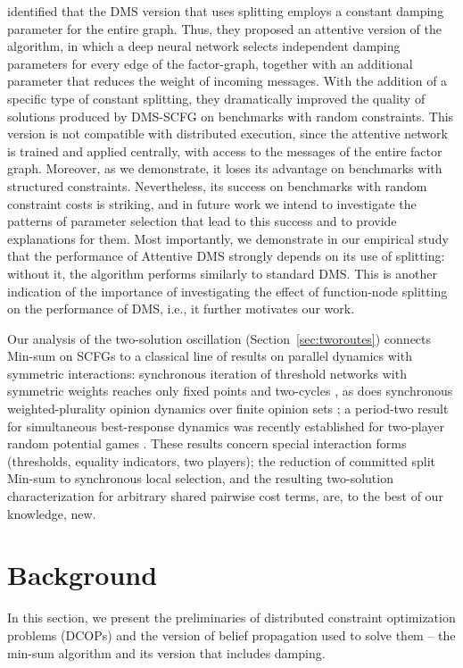 \documentclass[letterpaper]{article} %
\theoremstyle{definition}
\theoremstyle{remark}
\begin{document}
\citet{DengKL022} identified that the DMS version that uses splitting employs a constant damping parameter for the entire graph. Thus, they proposed an attentive version of the algorithm, in which a deep neural network selects independent damping parameters for every edge of the factor-graph, together with an additional parameter that reduces the weight of incoming messages. With the addition of a specific type of constant splitting, they dramatically improved the quality of solutions produced by DMS-SCFG on benchmarks with random constraints.
This version is not compatible with distributed execution, since the attentive network is trained and applied centrally, with access to the messages of the entire factor graph.%
Moreover, as we demonstrate, it loses its advantage on benchmarks with structured constraints. Nevertheless, its success on benchmarks with random constraint costs is striking, and in future work we intend to investigate the patterns of parameter selection that lead to this success and to provide explanations for them.
Most importantly, we demonstrate in our empirical study that the performance of Attentive DMS strongly depends on its use of splitting: without it, the algorithm performs similarly to standard DMS. This is another indication of the importance of investigating the effect of function-node splitting on the performance of DMS, i.e., it further motivates our work.

Our analysis of the two-solution oscillation (Section~\ref{sec:tworoutes}) connects Min-sum on SCFGs to a classical line of results on parallel dynamics with symmetric interactions: synchronous iteration of threshold networks with symmetric weights reaches only fixed points and two-cycles \citep{GolesOlivos80}, as does synchronous weighted-plurality opinion dynamics over finite opinion sets \citep{PoljakSura83}; a period-two result for simultaneous best-response dynamics was recently established for two-player random potential games \citep{AshkenaziGolan25}. These results concern special interaction forms (thresholds, equality indicators, two players); the reduction of committed split Min-sum to synchronous local selection, and the resulting two-solution characterization for arbitrary shared pairwise cost terms, are, to the best of our knowledge, new.


\section{Background}
\label{Sec:background}
In this section, we present the preliminaries of distributed constraint optimization problems (DCOPs) and the version of belief propagation used to solve them -- the min-sum algorithm and its version that includes damping.
\end{document}
